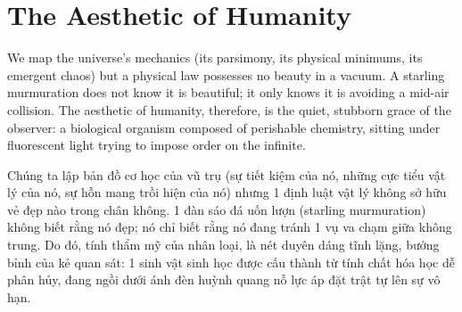 \documentclass[11pt]{article}
\begin{document}
\section{The Aesthetic of Humanity}
We map the universe's mechanics (its parsimony, its physical minimums, its emergent chaos) but a physical law possesses no beauty in a vacuum. A starling murmuration does not know it is beautiful; it only knows it is avoiding a mid-air collision. The aesthetic of humanity, therefore, is the quiet, stubborn grace of the observer: a biological organism composed of perishable chemistry, sitting under fluorescent light trying to impose order on the infinite.

Chúng ta lập bản đồ cơ học của vũ trụ (sự tiết kiệm của nó, những cực tiểu vật lý của nó, sự hỗn mang trồi hiện của nó) nhưng 1 định luật vật lý không sở hữu vẻ đẹp nào trong chân không. 1 đàn sáo đá uốn lượn (starling murmuration) không biết rằng nó đẹp; nó chỉ biết rằng nó đang tránh 1 vụ va chạm giữa không trung. Do đó, tính thẩm mỹ của nhân loại, là nét duyên dáng tĩnh lặng, bướng bỉnh của kẻ quan sát: 1 sinh vật sinh học được cấu thành từ tính chất hóa học dễ phân hủy, đang ngồi dưới ánh đèn huỳnh quang nỗ lực áp đặt trật tự lên sự vô hạn.
\end{document}
